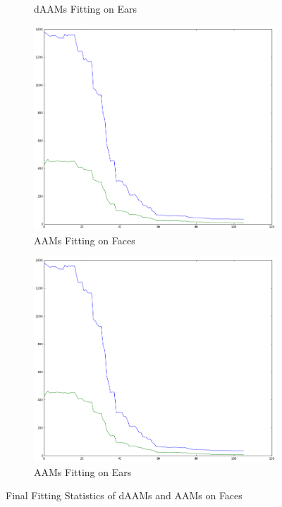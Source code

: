 \begin{figure}[h!]
\begin{subfigure}[b]{0.2\textwidth}
        \caption{dAAMs Fitting on Ears}
    \end{subfigure}
    \begin{subfigure}[b]{0.2\textwidth}
            \includegraphics[width=\textwidth]{supports/Model_Analysis/Shape_Reconstruct_ear_aam}
        \caption{AAMs Fitting on Faces}
    \end{subfigure}
    \qquad
    \begin{subfigure}[b]{0.2\textwidth}
            \includegraphics[width=\textwidth]{supports/Model_Analysis/Shape_Reconstruct_ear_aam_test}
        \caption{AAMs Fitting on Ears}
    \end{subfigure}
    \caption{Final Fitting Statistics of dAAMs and AAMs on Faces}
    \label{fig:rc_face}
\end{figure}

